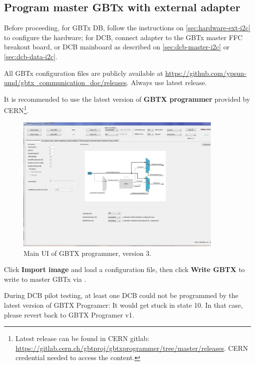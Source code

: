 \subsection{Program master GBTx with external \itwoc adapter}
Before proceeding, for GBTx DB, follow the instructions on
\autoref{sec:hardware-ext-i2c} to configure the hardware;
for DCB, connect \itwoc adapter to the GBTx master FFC breakout board, or DCB
mainboard as described on \autoref{sec:dcb-master-i2c} or
\autoref{sec:dcb-data-i2c}.

All GBTx configuration files are publicly available at
\url{https://github.com/ypsun-umd/gbtx_communication_doc/releases}.
Always use latest release.

It is recommended to use the latest version of \textbf{GBTX programmer} provided by
CERN\footnote{
    Latest release can be found in CERN gitlab:
    \url{https://gitlab.cern.ch/gbtproj/gbtxprogrammer/tree/master/releases}.
    CERN credential needed to access the content.
}.

\begin{figure}[!ht]
    \centering
    \includegraphics[width=0.9\textwidth]{res/gbtx_programmer_v3_ui.png}
    \caption{Main UI of GBTX programmer, version 3.}
    \label{fig:gbtx-programmer-ui}
\end{figure}

Click \textbf{Import image} and load a configuration file, then click
\textbf{Write GBTX} to write to master GBTx via \itwoc.

\begin{leftbar}
    During DCB pilot testing, at least one DCB could not be programmed by the
    latest version of GBTX Programer: It would get stuck in state 10.
    In that case, please revert back to GBTX Programer v1.
\end{leftbar}

